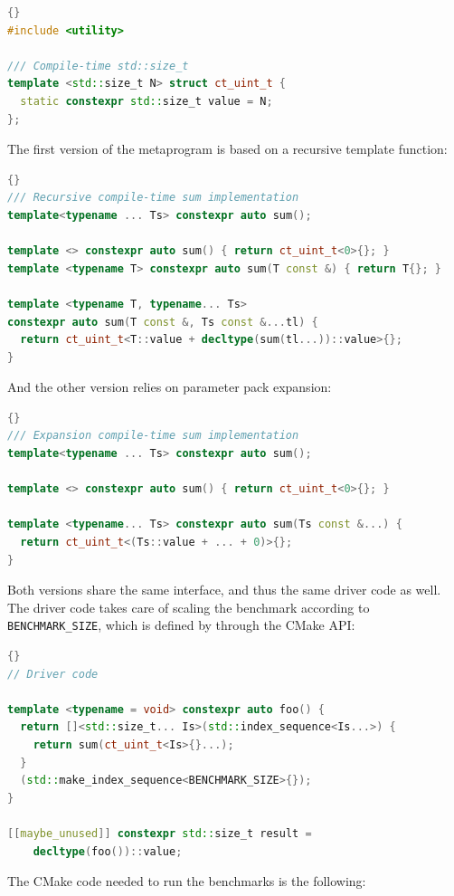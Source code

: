 \documentclass[../../main.tex]{subfiles}
\begin{document}
\begin{lstlisting}[language=C++]{}
#include <utility>

/// Compile-time std::size_t
template <std::size_t N> struct ct_uint_t {
  static constexpr std::size_t value = N;
};
\end{lstlisting}

The first version of the metaprogram is based on a recursive template function:

\begin{lstlisting}[language=C++]{}
/// Recursive compile-time sum implementation
template<typename ... Ts> constexpr auto sum();

template <> constexpr auto sum() { return ct_uint_t<0>{}; }
template <typename T> constexpr auto sum(T const &) { return T{}; }

template <typename T, typename... Ts>
constexpr auto sum(T const &, Ts const &...tl) {
  return ct_uint_t<T::value + decltype(sum(tl...))::value>{};
}
\end{lstlisting}

And the other version relies on  parameter pack expansion:

\begin{lstlisting}[language=C++]{}
/// Expansion compile-time sum implementation
template<typename ... Ts> constexpr auto sum();

template <> constexpr auto sum() { return ct_uint_t<0>{}; }

template <typename... Ts> constexpr auto sum(Ts const &...) {
  return ct_uint_t<(Ts::value + ... + 0)>{};
}
\end{lstlisting}

Both versions share the same interface, and thus the same driver code as well.
The driver code takes care of scaling the benchmark according to
\lstinline{BENCHMARK_SIZE}, which is defined by \ctbench through the CMake API:

\begin{lstlisting}[language=C++]{}
// Driver code

template <typename = void> constexpr auto foo() {
  return []<std::size_t... Is>(std::index_sequence<Is...>) {
    return sum(ct_uint_t<Is>{}...);
  }
  (std::make_index_sequence<BENCHMARK_SIZE>{});
}

[[maybe_unused]] constexpr std::size_t result =
    decltype(foo())::value;
\end{lstlisting}

The CMake code needed to run the benchmarks is the following:
\end{document}
